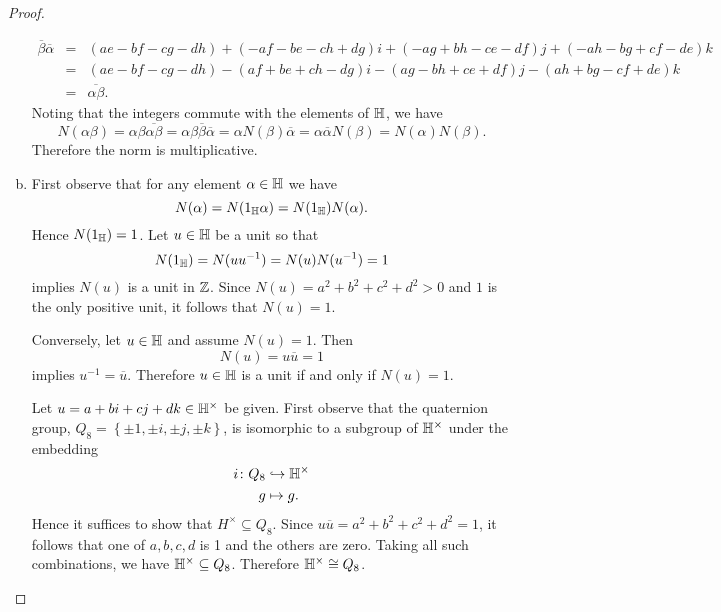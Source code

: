 \documentclass[10pt]{amsart}
\begin{document}
\begin{thm}
\begin{proof}
\begin{enumerate}[(a)]
\begin{eqnarray*}
          \overline{\beta}\overline{\alpha} &=& (ae - bf - cg - dh) + (-af -be -ch + dg)i + (-ag + bh - ce - df)j + (-ah -bg + cf -de)k\\
          &=& (ae - bf - cg - dh) -(af + be + ch - dg)i - (ag - bh + ce + df)j - (ah + bg - cf + de)k\\
          &=& \overline{\alpha\beta}.
        \end{eqnarray*}
        Noting that the integers commute with the elements of $\mathbb{H}$, we have
        $$N(\alpha\beta) = \alpha \beta \overline{\alpha \beta} = \alpha \beta \overline{\beta} \overline{\alpha} = \alpha N(\beta) \overline{\alpha} = \alpha \overline{\alpha} N(\beta) = N(\alpha)N(\beta).$$
        Therefore the norm is multiplicative.
      \item
        First observe that for any element $\alpha \in \mathbb{H}$ we have
        $$N(\alpha) = N(1_{\mathbb{H}} \alpha) = N(1_{\mathbb{H}})N(\alpha).$$
        Hence $N(1_{\mathbb{H}}) = 1$.
        Let $u \in \mathbb{H}$ be a unit so that
        $$N(1_{\mathbb{H}}) = N(uu^{-1}) = N(u)N(u^{-1}) = 1$$
        implies $N(u)$ is a unit in $\mathbb{Z}$.
        Since $N(u) = a^2 + b^2 + c^2 + d^2 > 0$ and $1$ is the only positive unit, it follows that $N(u) = 1$.
        
        Conversely, let $u \in \mathbb{H}$ and assume $N(u) = 1$.
        Then $$N(u) = u\overline{u} = 1$$ implies $u^{-1} = \overline{u}$.
        Therefore $u \in \mathbb{H}$ is a unit if and only if $N(u) = 1$.
        
        Let $u = a + bi + cj + dk \in \mathbb{H}^\times$ be given.
        First observe that the quaternion group, $Q_8 = \left\{\pm 1, \pm i, \pm j, \pm k \right\}$, is isomorphic to a subgroup of $\mathbb{H}^\times$ under the embedding
        \begin{align*}
          i \colon Q_8 &\hookrightarrow \mathbb{H}^\times\\
          g &\mapsto g.
        \end{align*}
        Hence it suffices to show that $H^\times \subseteq Q_8$.
        Since $u\overline{u} = a^2 + b^2 + c^2 + d^2 = 1$, it follows that one of $a, b, c, d$ is 1 and the others are zero.
        Taking all such combinations, we have $\mathbb{H}^\times \subseteq Q_8$.
        Therefore $\mathbb{H}^\times \cong Q_8$.
    \end{enumerate}
  \end{proof}
\end{thm}
\end{document}
